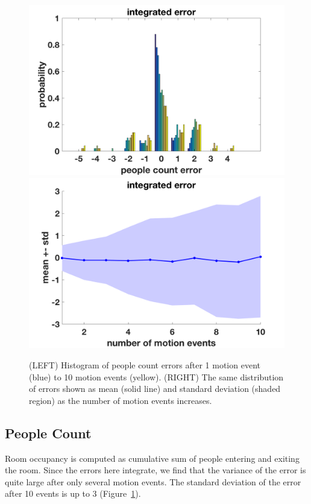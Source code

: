 \documentclass[12pt,oneside]{article} %
\begin{document}
\begin{figure}[!htb]
\includegraphics[scale=0.35]{images/pcerror_gamma020_hist.png}
\includegraphics[scale=0.35]{images/pcerror_gamma020.png}
\caption{(LEFT) Histogram of people count errors after 1 motion event (blue) to 10 motion events (yellow). (RIGHT) The same distribution of errors shown as mean (solid line) and standard deviation (shaded region) as the number of motion events increases.}
\label{hist}
\end{figure}

\clearpage
\subsection{People Count}
Room occupancy is computed as cumulative sum of people entering and exiting the room. Since the errors here
integrate, we find that the variance of the error is quite large after only several motion events.
The standard deviation of the error after 10 events is up to 3 (Figure~\ref{hist}).
\end{document}
